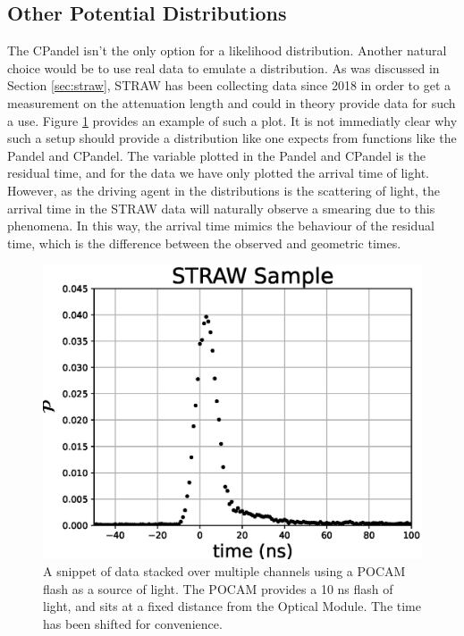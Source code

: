 \subsection{Other Potential Distributions}

The CPandel isn't the only option for a likelihood distribution. Another natural choice would be to use real data to emulate a distribution. As was discussed in Section \ref{sec:straw}, STRAW has been collecting data since 2018 in order to get a measurement on the attenuation length and could in theory provide data for such a use. Figure \ref{fig:straw_data} provides an example of such a plot. It is not immediatly clear why such a setup should provide a distribution like one expects from functions like the Pandel and CPandel. The variable plotted in the Pandel and CPandel is the residual time, and for the data we have only plotted the arrival time of light. However, as the driving agent in the distributions is the scattering of light, the arrival time in the STRAW data will naturally observe a smearing due to this phenomena. In this way, the arrival time mimics the behaviour of the residual time, which is the difference between the observed and geometric times. 

\begin{figure}[H]
  \centering
  \includegraphics[width=12cm]{./Figures/reco_plots/straw_data.eps}
  \caption{A snippet of data stacked over multiple channels using a POCAM flash as a source of light. The POCAM provides a 10 ns flash of light, and sits at a fixed distance from the Optical Module. The time has been shifted for convenience.} 
  \label{fig:straw_data}
\end{figure}

